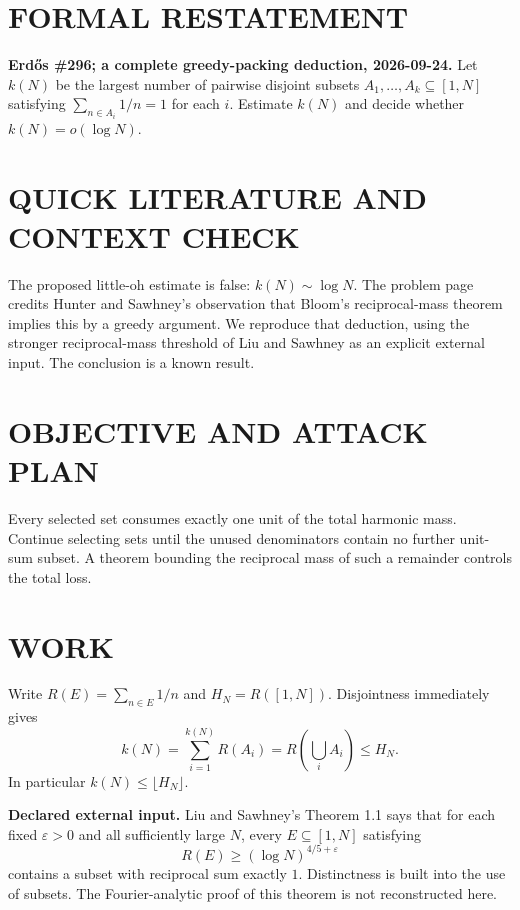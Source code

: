 \section{FORMAL RESTATEMENT}
\textbf{Erd\H{o}s \#296; a complete greedy-packing deduction, 2026-09-24.}
Let $k(N)$ be the largest number of pairwise disjoint subsets $A_1,\ldots,A_k\subseteq[1,N]$ satisfying $\sum_{n\in A_i}1/n=1$ for each $i$. Estimate $k(N)$ and decide whether $k(N)=o(\log N)$.

\section{QUICK LITERATURE AND CONTEXT CHECK}
The proposed little-oh estimate is false: $k(N)\sim\log N$. The problem page credits Hunter and Sawhney's observation that Bloom's reciprocal-mass theorem implies this by a greedy argument. We reproduce that deduction, using the stronger reciprocal-mass threshold of Liu and Sawhney as an explicit external input. The conclusion is a known result.

\section{OBJECTIVE AND ATTACK PLAN}
Every selected set consumes exactly one unit of the total harmonic mass. Continue selecting sets until the unused denominators contain no further unit-sum subset. A theorem bounding the reciprocal mass of such a remainder controls the total loss.

\section{WORK}
Write $R(E)=\sum_{n\in E}1/n$ and $H_N=R([1,N])$. Disjointness immediately gives
\[
k(N)=\sum_{i=1}^{k(N)}R(A_i)
=R\!\left(\bigcup_i A_i\right)\leq H_N.
\tag{1}
\]
In particular $k(N)\leq\lfloor H_N\rfloor$.

\textbf{Declared external input.} Liu and Sawhney's Theorem 1.1 says that for each fixed $\varepsilon>0$ and all sufficiently large $N$, every $E\subseteq[1,N]$ satisfying
\[
R(E)\geq(\log N)^{4/5+\varepsilon}
\tag{2}
\]
contains a subset with reciprocal sum exactly $1$. Distinctness is built into the use of subsets. The Fourier-analytic proof of this theorem is not reconstructed here.

